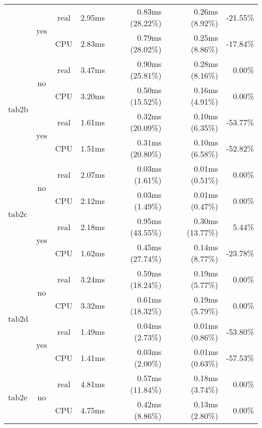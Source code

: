 \documentclass[en]{pracamgr}
\begin{document}
\begin{appendices}
\begin{small}
\begin{longtable}{|l|c|c|r|r|r|r|}
                          \cline{2-7}
                          & \multirow{2}{*}{yes} & real & 2.95ms & 0.83ms (28.22\%) & 0.26ms (8.92\%) & -21.55\% \\*
                          &                      & CPU  & 2.83ms & 0.79ms (28.02\%) & 0.25ms (8.86\%) & -17.84\% \\
\hline
\multirow{4}{*}{tab2b}    & \multirow{2}{*}{no}  & real & 3.47ms & 0.90ms (25.81\%) & 0.28ms (8.16\%) & 0.00\% \\*
                          &                      & CPU  & 3.20ms & 0.50ms (15.52\%) & 0.16ms (4.91\%) & 0.00\% \\*
                          \cline{2-7}
                          & \multirow{2}{*}{yes} & real & 1.61ms & 0.32ms (20.09\%) & 0.10ms (6.35\%) & -53.77\% \\*
                          &                      & CPU  & 1.51ms & 0.31ms (20.80\%) & 0.10ms (6.58\%) & -52.82\% \\
\hline
\multirow{4}{*}{tab2c}    & \multirow{2}{*}{no}  & real & 2.07ms & 0.03ms (1.61\%) & 0.01ms (0.51\%) & 0.00\% \\*
                          &                      & CPU  & 2.12ms & 0.03ms (1.49\%) & 0.01ms (0.47\%) & 0.00\% \\*
                          \cline{2-7}
                          & \multirow{2}{*}{yes} & real & 2.18ms & 0.95ms (43.55\%) & 0.30ms (13.77\%) & 5.44\% \\*
                          &                      & CPU  & 1.62ms & 0.45ms (27.74\%) & 0.14ms (8.77\%) & -23.78\% \\
\hline
\multirow{4}{*}{tab2d}    & \multirow{2}{*}{no}  & real & 3.24ms & 0.59ms (18.24\%) & 0.19ms (5.77\%) & 0.00\% \\*
                          &                      & CPU  & 3.32ms & 0.61ms (18.32\%) & 0.19ms (5.79\%) & 0.00\% \\*
                          \cline{2-7}
                          & \multirow{2}{*}{yes} & real & 1.49ms & 0.04ms (2.73\%) & 0.01ms (0.86\%) & -53.80\% \\*
                          &                      & CPU  & 1.41ms & 0.03ms (2.00\%) & 0.01ms (0.63\%) & -57.53\% \\
\hline
\multirow{4}{*}{tab2e}    & \multirow{2}{*}{no}  & real & 4.81ms & 0.57ms (11.84\%) & 0.18ms (3.74\%) & 0.00\% \\*
                          &                      & CPU  & 4.75ms & 0.42ms (8.86\%) & 0.13ms (2.80\%) & 0.00\% \\*

\end{longtable}
\end{small}
\end{appendices}
\end{document}
